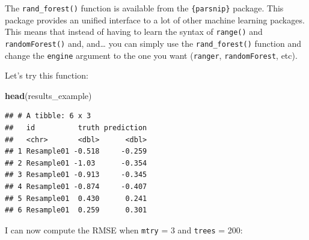 \documentclass[]{gitbook}
\newenvironment{Shaded}{\begin{snugshade}}{\end{snugshade}}
\newcommand{\DataTypeTok}[1]{\textcolor[rgb]{0.13,0.29,0.53}{#1}}
\newcommand{\DecValTok}[1]{\textcolor[rgb]{0.00,0.00,0.81}{#1}}
\newcommand{\KeywordTok}[1]{\textcolor[rgb]{0.13,0.29,0.53}{\textbf{#1}}}
\newcommand{\NormalTok}[1]{#1}
\newcommand{\OperatorTok}[1]{\textcolor[rgb]{0.81,0.36,0.00}{\textbf{#1}}}
\newcommand{\StringTok}[1]{\textcolor[rgb]{0.31,0.60,0.02}{#1}}
\theoremstyle{definition}
\theoremstyle{definition}
\theoremstyle{definition}
\theoremstyle{remark}
\begin{document}
The \texttt{rand\_forest()} function is available from the
\texttt{\{parsnip\}} package. This package provides an unified interface
to a lot of other machine learning packages. This means that instead of
having to learn the syntax of \texttt{range()} and
\texttt{randomForest()} and, and\ldots{} you can simply use the
\texttt{rand\_forest()} function and change the \texttt{engine} argument
to the one you want (\texttt{ranger}, \texttt{randomForest}, etc).

Let's try this function:

\begin{Shaded}
\end{Shaded}

\begin{Shaded}
\begin{Highlighting}[]
\KeywordTok{head}\NormalTok{(results_example)}
\end{Highlighting}
\end{Shaded}

\begin{verbatim}
## # A tibble: 6 x 3
##   id          truth prediction
##   <chr>       <dbl>      <dbl>
## 1 Resample01 -0.518     -0.259
## 2 Resample01 -1.03      -0.354
## 3 Resample01 -0.913     -0.345
## 4 Resample01 -0.874     -0.407
## 5 Resample01  0.430      0.241
## 6 Resample01  0.259      0.301
\end{verbatim}

I can now compute the RMSE when \texttt{mtry} = 3 and \texttt{trees} =
200:

\begin{Shaded}
\end{Shaded}
\end{document}
